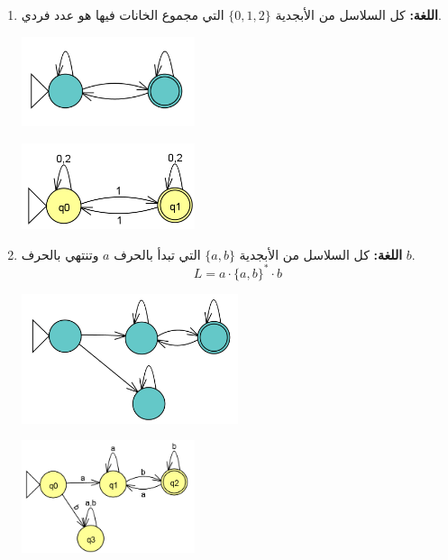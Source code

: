 ﻿\documentclass[12pt]{article}
\begin{document}
\begin{enumerate}[itemsep=3em]
\begin{enumerate}[itemsep=3em]
\begin{enumerate}
\item
\textbf{اللغة:} كل السلاسل من الأبجدية $\{0, 1, 2\}$ التي مجموع الخانات فيها هو عدد فردي.
\begin{center}
\includegraphics[width=0.4\textwidth]{../../../images/DFAs/ex1_p2_q1.png}
\end{center}
\ifwithsols
\begin{boxSolution}
    \begin{center}
        \includegraphics[width=0.4\textwidth]{../../../images/DFAs/ex1_p2_q2_sol.png}
    \end{center}
\end{boxSolution}
\clearpage
\fi

\item
\textbf{اللغة:} كل السلاسل من الأبجدية $\{a, b\}$ التي تبدأ بالحرف $a$ وتنتهي بالحرف $b$.
\[ L = a \cdot \{a, b\}^* \cdot b \]
\begin{center}
\includegraphics[width=0.5\textwidth]{../../../images/DFAs/ex1_p2_q3.png}
\end{center}
\ifwithsols
\begin{boxSolution}
    \begin{center}
        \includegraphics[width=0.4\textwidth]{../../../images/DFAs/ex1_p2_q3_sol.png}
    \end{center}
\end{boxSolution}
\fi


\end{enumerate}
\end{enumerate}
\end{enumerate}
\end{document}
